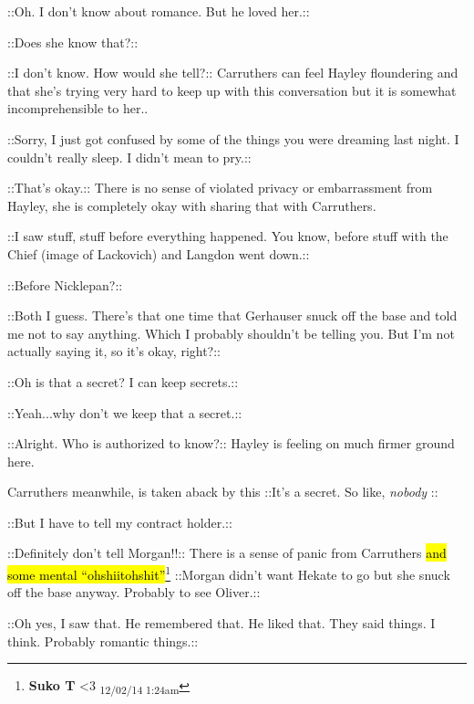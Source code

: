  {\color[RGB]{255,153,0}::Oh.  I don't know about romance.  But he loved her.::} 

 {\color[RGB]{153,0,255}::Does she know that?::} 

 {\color[RGB]{255,153,0}::I don't know.  How would she tell?::}  Carruthers can feel Hayley floundering and that she's trying very hard to keep up with this conversation but it is somewhat incomprehensible to her..

 {\color[RGB]{153,0,255}::Sorry, I just got confused by some of the things you were dreaming last night.  I couldn't really sleep.  I didn't mean to pry.::} 

 {\color[RGB]{255,153,0}::That's okay.::}   There is no sense of violated privacy or embarrassment from Hayley, she is completely okay with sharing that with Carruthers.

 {\color[RGB]{153,0,255}::I saw stuff, stuff before everything happened.  You know, before stuff with the Chief (image of Lackovich) and Langdon went down.::} 

 {\color[RGB]{255,153,0}::Before Nicklepan?::} 

 {\color[RGB]{153,0,255}::Both I guess.  There's that one time that Gerhauser snuck off the base and told me not to say anything.  Which I probably shouldn't be telling you.  But I'm not actually saying it, so it's okay, right?::} 

 {\color[RGB]{255,153,0}::Oh is that a secret?  I can keep secrets.::} 

 {\color[RGB]{153,0,255}::Yeah...why don't we keep that a secret.::} 

 {\color[RGB]{255,153,0}::Alright.  Who is authorized to know?::}   Hayley is feeling on much firmer ground here.

Carruthers meanwhile, is taken aback by this  {\color[RGB]{153,0,255}::It's a secret.  So like, } \textit{ {\color[RGB]{153,0,255}nobody} } {\color[RGB]{153,0,255}::} 

 {\color[RGB]{255,153,0}::But I have to tell my contract holder.::} 

 {\color[RGB]{153,0,255}::Definitely don't tell Morgan!!:: }  There is a sense of panic from Carruthers \hl{and some mental ``ohshiitohshit''}\footnote{\textbf{Suko T }\textless 3 \textsubscript{12/02/14 1:24am}}   {\color[RGB]{153,0,255}::Morgan didn't want Hekate to go but she snuck off the base anyway.  Probably to see Oliver.::} 

 {\color[RGB]{255,153,0}::Oh yes, I saw that.  He remembered that.  He liked that.  They said things.  I think.  Probably romantic things.::} 

